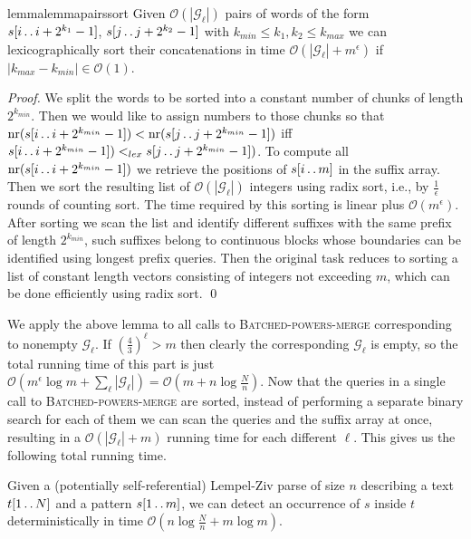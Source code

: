 \documentclass[runningheads]{llncs}
\DeclareMathOperator{\nr}{nr}
\newcommand{\twodots}{\mathinner{\ldotp\ldotp}}
\newcommand{\proc}[1]{\textnormal{\scshape#1}}
\begin{document}
\begin{restatable}{lemma}{lemmapairssort}
\label{lemma:pairs sort}
Given $\mathcal{O}(\left|\mathcal{G}_\ell\right|)$ pairs of words of the form $s[i\twodots i+2^{k_1}-1]$, $s[j\twodots j+2^{k_2}-1]$ with $k_{min}\leq k_1,k_2\leq k_{max}$ we can lexicographically sort their concatenations in time $\mathcal{O}(\left|\mathcal{G}_\ell\right|+m^\epsilon)$ if $|k_{max}-k_{min}|\in\mathcal{O}(1)$.
\end{restatable}

\begin{proof}
We split the words to be sorted into a constant number of chunks of length $2^{k_{min}}$. Then we would like to assign numbers to those chunks so that $\nr(s[i\twodots i+2^{k_{min}}-1])<\nr(s[j\twodots j+2^{k_{min}}-1])$ iff $s[i\twodots i+2^{k_{min}}-1]) <_{lex} s[j\twodots j+2^{k_{min}}-1])$. To compute all $\nr(s[i\twodots i+2^{k_{min}}-1])$ we retrieve the positions of $s[i\twodots m]$ in the suffix array. Then we sort the resulting list of $\mathcal{O}(\left|\mathcal{G}_\ell\right|)$ integers using radix sort, i.e., by $\frac{1}{\epsilon}$ rounds of counting sort. The time required by this sorting is linear plus $\mathcal{O}(m^\epsilon)$. After sorting we scan the list and identify different suffixes with the same prefix of length $2^{k_{min}}$, such suffixes belong to continuous blocks whose boundaries can be identified using longest prefix queries. Then the original task reduces to sorting a list of constant length vectors consisting of integers not exceeding $m$, which can be done efficiently using radix sort.
\qed
\end{proof}

We apply the above lemma to all calls to \proc{Batched-powers-merge} corresponding to nonempty $\mathcal{G}_\ell$. If $(\frac{4}{3})^\ell > m$ then clearly the corresponding $\mathcal{G}_\ell$ is empty, so the total running time of this part is just $\mathcal{O}(m^\epsilon\log m+\sum_\ell\left|\mathcal{G}_\ell\right|)=\mathcal{O}(m+n\log\frac{N}{n})$. Now that the queries in a single call to \proc{Batched-powers-merge} are sorted, instead of performing a separate binary search for each of them we can scan the queries and the suffix array at once, resulting in a $\mathcal{O}(|\mathcal{G}_{\ell}|+m)$ running time for each different $\ell$. This gives us the following total running time.

\begin{theorem}\label{theorem:slower}
Given a (potentially self-referential) Lempel-Ziv parse of size $n$ describing a text $t[1\twodots N]$ and a pattern $s[1\twodots m]$, we can detect an occurrence of $s$ inside $t$ deterministically in time $\mathcal{O}(n\log\frac{N}{n}+m\log m)$.
\end{theorem}
\end{document}
